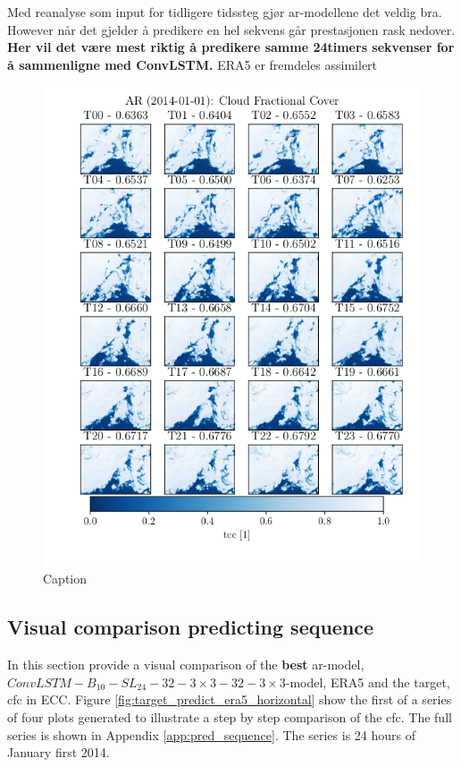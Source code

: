 Med reanalyse som input for tidligere tidssteg gjør ar-modellene det veldig bra. However når det gjelder å predikere en hel sekvens går prestasjonen rask nedover. \textbf{Her vil det være mest riktig å predikere samme 24timers sekvenser for å sammenligne med ConvLSTM.} ERA5 er fremdeles assimilert 
\begin{figure}
    \centering
    \includegraphics{python_figs/AR_timelapse_cloud_cover_24hrs_from_2014_01_01_base_on_one_hrERA5.png}
    \caption{Caption}
    \label{fig:my_label}
\end{figure}


\subsection{Visual comparison predicting sequence}
In this section provide a visual comparison of the \textbf{best} \acrshort{ar}-model, $ConvLSTM-B_{10}-SL_{24}-32-3\times3-32-3 \times3$-model, ERA5 and the target, \acrshort{cfc} in \acrshort{ECC}. Figure \ref{fig:target_predict_era5_horizontal} show the first of a series of four plots generated to illustrate a step by step comparison of the \acrshort{cfc}. The full series is shown in Appendix \ref{app:pred_sequence}. The series is 24 hours of January first 2014.

